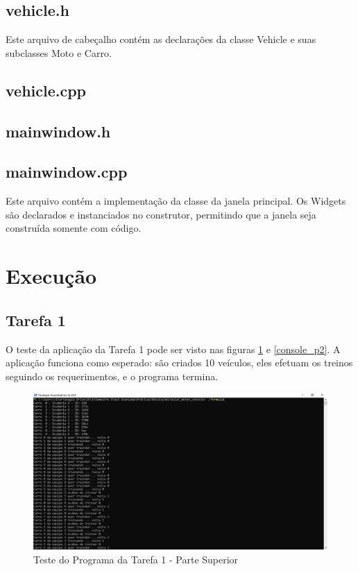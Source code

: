 \documentclass[12pt,a4paper]{article}
\begin{document}
\subsection*{vehicle.h}
Este arquivo de cabeçalho contém as declarações da classe Vehicle e suas subclasses Moto e Carro.


\subsection*{vehicle.cpp}


\subsection*{mainwindow.h}


\subsection*{mainwindow.cpp}
Este arquivo contém a implementação da classe da janela principal. Os Widgets são declarados e instanciados no construtor, permitindo que a janela seja construída somente com código.


\section{Execução}
\subsection*{Tarefa 1}
O teste da aplicação da Tarefa 1 pode ser visto nas figuras \ref{console_p1} e \ref{console_p2}. A aplicação funciona como esperado: são criados 10 veículos, eles efetuam os treinos seguindo os requerimentos, e o programa termina.
\begin{figure}[H]
\centering
\includegraphics[width=\textwidth]{console_p1}
\caption{Teste do Programa da Tarefa 1 - Parte Superior}
\label{console_p1}
\end{figure}
\end{document}

